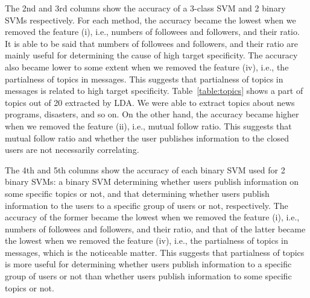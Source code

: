 The 2nd and 3rd columns show the accuracy of a 3-class SVM
and 2 binary SVMs respectively.  For each method, the accuracy became
the lowest when we removed the feature (i), i.e., numbers of followees and
followers, and their ratio.  It is able to be said that numbers of
followees and followers, and their ratio are mainly useful for
determining the cause of high target specificity.  The accuracy also
became lower to some extent when we removed the feature (iv), i.e.,
the partialness of topics in messages.  This suggests that partialness of
topics in messages is related to high target specificity.
Table~\ref{table:topics} shows a part of topics out of 20 extracted by
LDA.  We were able to extract topics about news programs, disasters, and
so on.  On the other hand, the accuracy became higher when we removed
the feature (ii), i.e., mutual follow ratio.  This suggests that mutual
follow ratio and whether the user publishes information to the closed
users are not necessarily correlating.

The 4th and 5th columns show the accuracy of each binary SVM used for
2 binary SVMs: a binary SVM determining whether users publish
information on some specific topics or not, and that determining
whether users publish information to the users to a specific group of users
or not,
respectively.  The accuracy of the former became the lowest when we
removed the feature (i), i.e., numbers of followees and followers, and their
ratio, and that of the latter became the lowest when we removed the
feature (iv), i.e., the partialness of topics in messages, which is the
noticeable
matter.  This suggests that partialness of topics is more useful for
determining whether users publish information to a specific group of
users or not than whether users publish information to some specific
topics or not.
